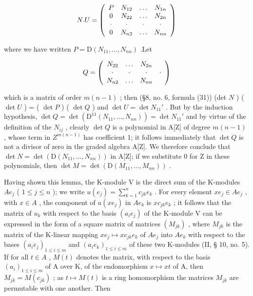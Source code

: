 \[
N. U = \left( \begin{array}{c c c c} P & N _ {1 2} & \ldots & N _ {1 n} \\ 0 & N _ {2 2} & \ldots & N _ {2 n} \\ \cdot & \cdot & \cdot & \cdot \\ 0 & N _ {n 2} & \ldots & N _ {n n} \end{array} \right)
\]

where we have written \(P = \mathrm{D}(N_{11},\ldots ,N_{nn})\) .Let

\[
Q = \left( \begin{array}{c c c c} N _ {2 2} & \ldots & N _ {2 n} \\ \cdot & \cdot & \cdot & \cdot \\ N _ {n 2} & \ldots & N _ {n n} \end{array} \right)
\]

which is a matrix of order \(m(n - 1)\) ; then (§8, no. 6, formula (31)) (det \(N\) ) ( \(\det U\) ) = ( \(\det P\) ) ( \(\det Q\) ) and \(\det U = \det N_{11}'\) . But by the induction hypothesis, \(\det Q = \det(\mathrm{D}^{11}(N_{11},\ldots ,N_{nn})) = \det N_{11}'\) and by virtue of the definition of the \(N_{ij}\) , clearly \(\det Q\) is a polynomial in A{[}Z{]} of degree \(m(n - 1)\) , whose term in \(Z^{m(n - 1)}\) has coefficient 1; it follows immediately that \(\det Q\) is not a divisor of zero in the graded algebra A{[}Z{]}. We therefore conclude that \(\det N = \det(\mathrm{D}(N_{11},\ldots ,N_{nn}))\) in A{[}Z{]}; if we substitute 0 for Z in these polynomials, then \(\det M = \det(\mathrm{D}(M_{11},\ldots ,M_{nn}))\) .

Having shown this lemma, the K-module V is the direct sum of the K-modules \(Ae_{j}\) ( \(1 \leqslant j \leqslant n\) ); we write \(u(e_{j}) = \sum_{k=1}^{n} c_{jk} e_{k}\) . For every element \(xe_{j} \in Ae_{j}\) , with \(x \in A\) , the component of \(u(xe_{j})\) in \(Ae_{k}\) is \(xc_{jk} e_{k}\) ; it follows that the matrix of \(u_{k}\) with respect to the basis \((a_{i} e_{j})\) of the K-module V can be expressed in the form of a square matrix of matrices \((M_{jk})\) , where \(M_{jk}\) is the matrix of the K-linear mapping \(xe_{j} \mapsto xc_{jk} e_{k}\) of \(Ae_{j}\) into \(Ae_{k}\) with respect to the bases \((a_{i} e_{j})_{1 \leqslant i \leqslant m}\) and \((a_{i} e_{k})_{1 \leqslant i \leqslant m}\) of these two K-modules (II, § 10, no. 5). If for all \(t \in A\) , \(M(t)\) denotes the matrix, with respect to the basis \((a_{i})_{1 \leqslant i \leqslant m}\) of A over K, of the endomorphism \(x \mapsto xt\) of A, then \(M_{jk} = M(c_{jk})\) ; as \(t \mapsto M(t)\) is a ring homomorphism the matrices \(M_{jk}\) are permutable with one another. Then


